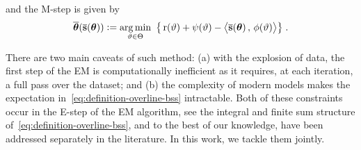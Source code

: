 \documentclass[12pt]{article}
\begin{document}
and the {M-step} is given by
\begin{align}\label{eq:mstep}
\overline{{\bm{\theta}}}( \overline{{\mathbf{s}}}({\bm{\theta}}) ) \mathrel{\mathop:}= \mathop{\mathrm{arg\,min}}_{ \vartheta \in \Theta } ~\big\{ \operatorname{r}( \vartheta ) + \psi( \vartheta) - \big\langle \overline{{\mathbf{s}}}({\bm{\theta}})\, , \, \phi ( \vartheta)  \big\rangle \big\} \;.
\end{align}


There are two main caveats of such method: {(a)} with the explosion of data, the first step of the EM is computationally inefficient as it requires, at each iteration, a full pass over the dataset; and {(b)} the complexity of modern  models makes the expectation in~\eqref{eq:definition-overline-bss} intractable. 
Both of these constraints occur in the E-step of the EM algorithm, see the integral and finite sum structure of~\eqref{eq:definition-overline-bss}, and to the best of our knowledge, have been addressed separately in the literature. 
In this work, we tackle them jointly.
\end{document}
